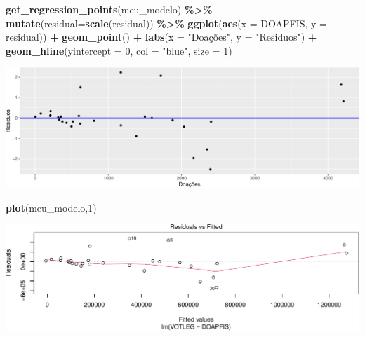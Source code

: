 \documentclass[
  9pt,
  ignorenonframetext,
  aspectratio=169]{beamer}
\newenvironment{Shaded}{\begin{snugshade}}{\end{snugshade}}
\newcommand{\DataTypeTok}[1]{\textcolor[rgb]{0.13,0.29,0.53}{#1}}
\newcommand{\DecValTok}[1]{\textcolor[rgb]{0.00,0.00,0.81}{#1}}
\newcommand{\KeywordTok}[1]{\textcolor[rgb]{0.13,0.29,0.53}{\textbf{#1}}}
\newcommand{\NormalTok}[1]{#1}
\newcommand{\OperatorTok}[1]{\textcolor[rgb]{0.81,0.36,0.00}{\textbf{#1}}}
\newcommand{\StringTok}[1]{\textcolor[rgb]{0.31,0.60,0.02}{#1}}
\begin{document}
\begin{frame}[fragile]{}
\protect\hypertarget{section-5}{}
\begin{Shaded}
\begin{Highlighting}[]
\KeywordTok{get\_regression\_points}\NormalTok{(meu\_modelo) }\OperatorTok{\%\textgreater{}\%}\StringTok{ }\KeywordTok{mutate}\NormalTok{(}\DataTypeTok{residual=}\KeywordTok{scale}\NormalTok{(residual)) }\OperatorTok{\%\textgreater{}\%}
\StringTok{  }\KeywordTok{ggplot}\NormalTok{(}\KeywordTok{aes}\NormalTok{(}\DataTypeTok{x =}\NormalTok{ DOAPFIS, }\DataTypeTok{y =}\NormalTok{ residual)) }\OperatorTok{+}
\StringTok{  }\KeywordTok{geom\_point}\NormalTok{() }\OperatorTok{+}\StringTok{ }\KeywordTok{labs}\NormalTok{(}\DataTypeTok{x =} \StringTok{"Doações"}\NormalTok{, }\DataTypeTok{y =} \StringTok{"Residuos"}\NormalTok{) }\OperatorTok{+}
\StringTok{  }\KeywordTok{geom\_hline}\NormalTok{(}\DataTypeTok{yintercept =} \DecValTok{0}\NormalTok{, }\DataTypeTok{col =} \StringTok{"blue"}\NormalTok{, }\DataTypeTok{size =} \DecValTok{1}\NormalTok{)}
\end{Highlighting}
\end{Shaded}

\includegraphics{aula_12_files/figure-beamer/unnamed-chunk-19-1.pdf}
\end{frame}

\begin{frame}[fragile]{}
\protect\hypertarget{section-6}{}
\begin{Shaded}
\begin{Highlighting}[]
\KeywordTok{plot}\NormalTok{(meu\_modelo,}\DecValTok{1}\NormalTok{)}
\end{Highlighting}
\end{Shaded}

\includegraphics{aula_12_files/figure-beamer/unnamed-chunk-20-1.pdf}
\end{frame}
\end{document}

